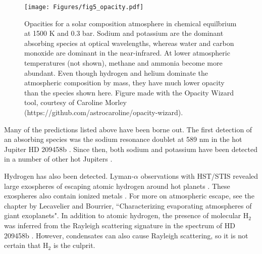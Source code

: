 \documentclass[graybox,natbib,nosecnum]{svmult}
\newcommand{\hbindex}[1]{\hl{#1}\index{#1}}  %
\begin{document}
\begin{figure}
\begin{centering}
\texttt{[image: Figures/fig5\_opacity.pdf]}
\caption{Opacities for a solar composition atmosphere in chemical equilbrium at 1500 K and 0.3 bar. Sodium and potassium are the dominant absorbing species at optical wavelengths, whereas water and carbon monoxide are dominant in the near-infrared. At lower atmospheric temperatures (not shown), methane and ammonia become more abundant. Even though hydrogen and helium dominate the atmospheric composition by mass, they have much lower opacity than the species shown here. Figure made with the Opacity Wizard tool, courtesy of Caroline Morley (https://github.com/astrocaroline/opacity-wizard).}
\label{fig:opacity}       
\end{centering}
\end{figure}


Many of the predictions listed above have been borne out.  The first detection of an absorbing species was the sodium resonance doublet at 589 nm in the hot Jupiter HD 209458b \citep{charbonneau02}. Since then, both sodium and potassium have been detected in a number of other hot Jupiters \citep[e.g.][]{sing11b, nikolov14}. 

Hydrogen has also been detected.  Lyman-$\alpha$ observations with HST/STIS revealed large exospheres of escaping atomic hydrogen around hot planets \citep[e.g.][]{vidal-madjar03, ehrenreich15}.  These exospheres also contain ionized metals \citep[e.g., OI, CII;][]{vidal-madjar04}. For more on atmospheric escape, see the chapter by Lecavelier and Bourrier, ``Characterizing evaporating atmospheres of giant exoplanets". In addition to atomic hydrogen, the presence of molecular H$_2$ was inferred from the Rayleigh scattering signature in the spectrum of HD 209458b \citep{lecavelier08}. However, condensates can also cause Rayleigh scattering, so it is not certain that H$_2$ is the culprit. 
\end{document}
